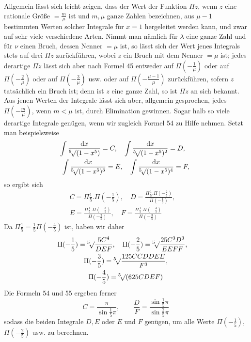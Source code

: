 Allgemein lässt sich leicht zeigen, dass der Wert der Funktion $\Pi z$, wenn $z$ eine rationale Größe $=\frac m\mu$ ist und $m,\mu$ ganze Zahlen bezeichnen, aus $\mu-1$ bestimmten Werten solcher Integrale für $x=1$ hergeleitet werden kann, und zwar auf sehr viele verschiedene Arten. Nimmt man nämlich für $\lambda$ eine ganze Zahl und für $\nu$ einen Bruch, dessen Nenner $=\mu$ ist, so lässt sich der Wert jenes Integrals stets auf drei $\Pi z$ zurückführen, wobei $z$ ein Bruch mit dem Nenner $=\mu$ ist; jedes derartige $\Pi z$ lässt sich aber nach Formel 45 entweder auf $\Pi(-\frac1\mu)$ oder auf $\Pi(-\frac2\mu)$ oder auf $\Pi(-\frac3\mu)$ usw. oder auf $\Pi(-\frac{\mu-1}{\mu})$ zurückführen, sofern $z$ tatsächlich ein Bruch ist; denn ist $z$ eine ganze Zahl, so ist $\Pi z$ an sich bekannt. Aus jenen Werten der Integrale lässt sich aber, allgemein gesprochen, jedes $\Pi(-\frac m\mu)$,
wenn $m<\mu$ ist, durch Elimination gewinnen.
Sogar halb so viele derartige Integrale genügen, wenn wir zugleich Formel 54 zu Hilfe nehmen. Setzt man beispielsweise
\[
\begin{gathered}
\int\frac{\mathrm{d}x}{\BareRoot[5]{(1-x^5)}}=C,\quad
\int\frac{\mathrm{d}x}{\BareRoot[5]{(1-x^5)^2}}=D,\quad
\\\int\frac{\mathrm{d}x}{\BareRoot[5]{(1-x^5)^3}}=E,\quad
\int\frac{\mathrm{d}x}{\BareRoot[5]{(1-x^5)^4}}=F,
\end{gathered}
\]
so ergibt sich
\[
\begin{gathered}
C=\Pi\frac15.\Pi(-\frac15),\quad
D=\frac{\Pi\frac15.\Pi(-\frac25)}{\Pi(-\frac15)},\quad
\\E=\frac{\Pi\frac15.\Pi(-\frac35)}{\Pi(-\frac25)},\quad
F=\frac{\Pi\frac15.\Pi(-\frac45)}{\Pi(-\frac35)}
\end{gathered}
\]
Da $\Pi\frac15=\frac15\Pi(-\frac45)$ ist, haben wir daher
\[
\begin{gathered}
\Pi(-\frac15)=\BareRoot[5]{\frac{5C^4}{DEF}},\quad
\Pi(-\frac25)=\BareRoot[5]{\frac{25C^3D^3}{EEFF}},\quad
\\\Pi(-\frac35)=\BareRoot[5]{\frac{125CCDDEE}{F^3}},\\
\Pi(-\frac45)=\BareRoot[5]{(625CDEF)}
\end{gathered}
\]
Die Formeln 54 und 55 ergeben ferner
\[
C=\frac\pi{\sin\frac15\pi},\qquad
\frac DF=\frac{\sin\frac15\pi}{\sin\frac25\pi}
\]
sodass die beiden Integrale $D,E$ oder $E$ und $F$ genügen, um alle Werte $\Pi(-\frac15)$, $\Pi(-\frac25)$ usw. zu berechnen.

